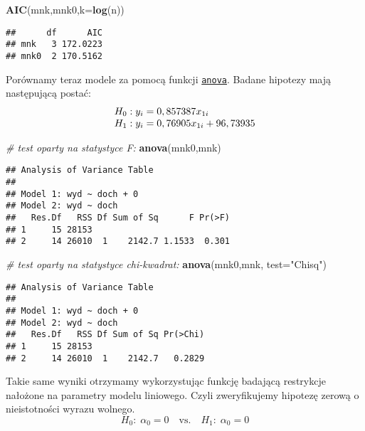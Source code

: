 \documentclass[polish,]{book}
\newenvironment{Shaded}{\begin{snugshade}}{\end{snugshade}}
\newcommand{\CommentTok}[1]{\textcolor[rgb]{0.56,0.35,0.01}{\textit{#1}}}
\newcommand{\DataTypeTok}[1]{\textcolor[rgb]{0.13,0.29,0.53}{#1}}
\newcommand{\KeywordTok}[1]{\textcolor[rgb]{0.13,0.29,0.53}{\textbf{#1}}}
\newcommand{\NormalTok}[1]{#1}
\newcommand{\StringTok}[1]{\textcolor[rgb]{0.31,0.60,0.02}{#1}}
\begin{document}
\begin{Shaded}
\begin{Highlighting}[]
\KeywordTok{AIC}\NormalTok{(mnk,mnk0,}\DataTypeTok{k=}\KeywordTok{log}\NormalTok{(n))}
\end{Highlighting}
\end{Shaded}

\begin{verbatim}
##      df      AIC
## mnk   3 172.0223
## mnk0  2 170.5162
\end{verbatim}

Porównamy teraz modele za pomocą funkcji \href{https://rdrr.io/r/stats/anova.html}{\texttt{anova}}. Badane hipotezy mają
następującą postać:
\begin{equation*}
\begin{array}{r@{}l}
H_0:&\;y_i=0,857387x_{1i}\\
H_1:&\;y_i=0,76905x_{1i}+96,73935
\end{array}
\end{equation*}

\begin{Shaded}
\begin{Highlighting}[]
\CommentTok{# test oparty na statystyce F:}
\KeywordTok{anova}\NormalTok{(mnk0,mnk)}
\end{Highlighting}
\end{Shaded}

\begin{verbatim}
## Analysis of Variance Table
## 
## Model 1: wyd ~ doch + 0
## Model 2: wyd ~ doch
##   Res.Df   RSS Df Sum of Sq      F Pr(>F)
## 1     15 28153                           
## 2     14 26010  1    2142.7 1.1533  0.301
\end{verbatim}

\begin{Shaded}
\begin{Highlighting}[]
\CommentTok{# test oparty na statystyce chi-kwadrat:}
\KeywordTok{anova}\NormalTok{(mnk0,mnk, }\DataTypeTok{test=}\StringTok{"Chisq"}\NormalTok{)}
\end{Highlighting}
\end{Shaded}

\begin{verbatim}
## Analysis of Variance Table
## 
## Model 1: wyd ~ doch + 0
## Model 2: wyd ~ doch
##   Res.Df   RSS Df Sum of Sq Pr(>Chi)
## 1     15 28153                      
## 2     14 26010  1    2142.7   0.2829
\end{verbatim}

Takie same wyniki otrzymamy wykorzystując funkcję badającą restrykcje nałożone
na parametry modelu liniowego. Czyli zweryfikujemy hipotezę zerową o
nieistotności wyrazu wolnego.
\[
H_0:\;\alpha_0=0\quad\mbox{vs.}\quad H_1:\;\alpha_0=0
\]
\end{document}

